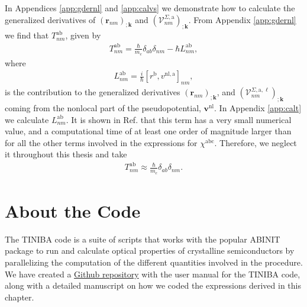 In Appendices \ref{app:gdernl} and \ref{app:calvs} we demonstrate how to
calculate the generalized derivatives of
$\left(\mathbf{r}_{nm}\right)_{;\mathbf{k}}$ and
$\left(\mathcal{V}^{\Sigma,\mathrm{a}}_{nm}\right)_{;\mathbf{k}}$. From
Appendix \ref{app:gdernl} we find that
$T_{nm}^{\mathrm{ab}}$, given by
\begin{align}\label{tau.1}
T_{nm}^{\mathrm{ab}}
= \frac{\hbar}{m_{e}}\delta_{ab}\delta_{nm}
- \hbar L_{nm}^{\mathrm{ab}},
\end{align}  
where
\begin{align}\label{tau.2}
L_{nm}^{\mathrm{ab}}
= \frac{i}{\hbar}\left[r^{\mathrm{b}},v^{\mathrm{nl},\mathrm{a}}\right]_{nm},
\end{align}
is the contribution to the generalized derivatives
$\left(\mathbf{r}_{nm}\right)_{;\mathbf{k}}$, and
$\left(\mathcal{V}^{\Sigma,\mathrm{a},\ell}_{nm}\right)_{;\mathbf{k}}$ coming
from the nonlocal part of the pseudopotential, $\mathbf{v}^{\mathrm{nl}}$. In
Appendix \ref{app:calt} we calculate $L^{\mathrm{ab}}_{nm}$. It is shown in Ref.
\cite{valerie} that this term has a very small numerical value, and a
computational time of at least one order of magnitude larger than for all the
other terms involved in the expressions for $\chi^{\mathrm{abc}}$. Therefore, we
neglect it throughout this thesis and take
\begin{align}\label{tau.69}
T_{nm}^{\mathrm{ab}} \approx \frac{\hbar}{m_{e}}\delta_{ab}\delta_{nm}.
\end{align} 



\section{About the Code}

The TINIBA code is a suite of scripts that works with the popular ABINIT package
to run and calculate optical properties of crystalline semiconductors by
parallelizing the computation of the different quantities involved in the
procedure. We have created a
\href{https://github.com/roguephysicist/tiniba-manual}{Github repository}
with the user manual for the TINIBA code, along with a detailed manuscript on
how we coded the expressions derived in this chapter.



